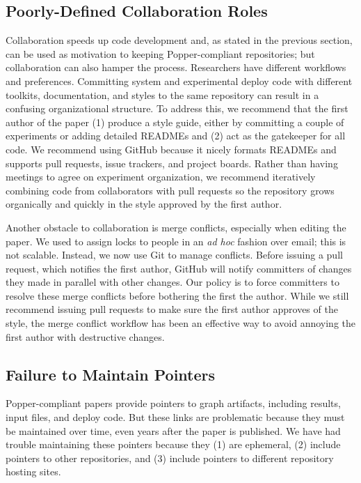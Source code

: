 \subsection{Poorly-Defined Collaboration Roles}

Collaboration  speeds up code development and, as stated in the previous
section, can be used as motivation to keeping Popper-compliant repositories;
but collaboration can also hamper the process.  Researchers have different
workflows and preferences. Committing system and experimental deploy code with
different toolkits, documentation, and styles to the same repository can result
in a confusing organizational structure.  To address this, we recommend that
the first author of the paper (1) produce a style guide, either by committing a
couple of experiments or adding detailed READMEs and (2) act as the gatekeeper
for all code. We recommend using GitHub because it nicely formats READMEs and
supports pull requests, issue trackers, and project boards.  Rather than having
meetings to agree on experiment organization, we recommend iteratively
combining code from collaborators with pull requests so the repository grows
organically and quickly in the style approved by the first author.

Another obstacle to collaboration is merge conflicts, especially when editing
the paper. We used to assign locks to people in an {\it ad hoc} fashion over
email; this is not scalable. Instead, we now use Git to manage conflicts.
Before issuing a pull request, which notifies the first author, GitHub will
notify committers of changes they made in parallel with other changes. Our
policy is to force committers to resolve these merge conflicts before bothering
the first the author. While we still recommend issuing pull requests to make
sure the first author approves of the style, the merge conflict workflow has
been an effective way to avoid annoying the first author with destructive
changes.

\subsection{Failure to Maintain Pointers}

Popper-compliant papers provide pointers to graph artifacts, including results,
input files, and deploy code. But these links are problematic because they must
be maintained over time, even years after the paper is published. We have had
trouble maintaining these pointers because they (1) are ephemeral, (2) include
pointers to other repositories, and (3) include pointers to different
repository hosting sites.

